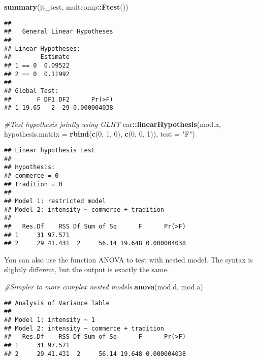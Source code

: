 \documentclass[]{book}
\newenvironment{Shaded}{\begin{snugshade}}{\end{snugshade}}
\newcommand{\CommentTok}[1]{\textcolor[rgb]{0.56,0.35,0.01}{\textit{#1}}}
\newcommand{\DataTypeTok}[1]{\textcolor[rgb]{0.13,0.29,0.53}{#1}}
\newcommand{\DecValTok}[1]{\textcolor[rgb]{0.00,0.00,0.81}{#1}}
\newcommand{\KeywordTok}[1]{\textcolor[rgb]{0.13,0.29,0.53}{\textbf{#1}}}
\newcommand{\NormalTok}[1]{#1}
\newcommand{\OperatorTok}[1]{\textcolor[rgb]{0.81,0.36,0.00}{\textbf{#1}}}
\newcommand{\StringTok}[1]{\textcolor[rgb]{0.31,0.60,0.02}{#1}}
\theoremstyle{definition}
\theoremstyle{definition}
\theoremstyle{definition}
\theoremstyle{remark}
\begin{document}
\begin{Shaded}
\begin{Highlighting}[]
\KeywordTok{summary}\NormalTok{(jt_test, multcomp}\OperatorTok{::}\KeywordTok{Ftest}\NormalTok{())}
\end{Highlighting}
\end{Shaded}

\begin{verbatim}
## 
##   General Linear Hypotheses
## 
## Linear Hypotheses:
##        Estimate
## 1 == 0  0.09522
## 2 == 0  0.11992
## 
## Global Test:
##       F DF1 DF2      Pr(>F)
## 1 19.65   2  29 0.000004038
\end{verbatim}

\begin{Shaded}
\begin{Highlighting}[]
\CommentTok{#Test hypothesis jointly using GLHT}
\NormalTok{car}\OperatorTok{::}\KeywordTok{linearHypothesis}\NormalTok{(mod.a, }\DataTypeTok{hypothesis.matrix =} \KeywordTok{rbind}\NormalTok{(}\KeywordTok{c}\NormalTok{(}\DecValTok{0}\NormalTok{, }\DecValTok{1}\NormalTok{, }\DecValTok{0}\NormalTok{), }\KeywordTok{c}\NormalTok{(}\DecValTok{0}\NormalTok{, }\DecValTok{0}\NormalTok{, }\DecValTok{1}\NormalTok{)), }\DataTypeTok{test =} \StringTok{"F"}\NormalTok{)}
\end{Highlighting}
\end{Shaded}

\begin{verbatim}
## Linear hypothesis test
## 
## Hypothesis:
## commerce = 0
## tradition = 0
## 
## Model 1: restricted model
## Model 2: intensity ~ commerce + tradition
## 
##   Res.Df    RSS Df Sum of Sq      F      Pr(>F)
## 1     31 97.571                                
## 2     29 41.431  2     56.14 19.648 0.000004038
\end{verbatim}

You can also use the function ANOVA to test with nested model. The
syntax is slightly different, but the output is exactly the same.

\begin{Shaded}
\begin{Highlighting}[]
\CommentTok{#Simpler to more complex nested models}
\KeywordTok{anova}\NormalTok{(mod.d, mod.a)}
\end{Highlighting}
\end{Shaded}

\begin{verbatim}
## Analysis of Variance Table
## 
## Model 1: intensity ~ 1
## Model 2: intensity ~ commerce + tradition
##   Res.Df    RSS Df Sum of Sq      F      Pr(>F)
## 1     31 97.571                                
## 2     29 41.431  2     56.14 19.648 0.000004038
\end{verbatim}
\end{document}
